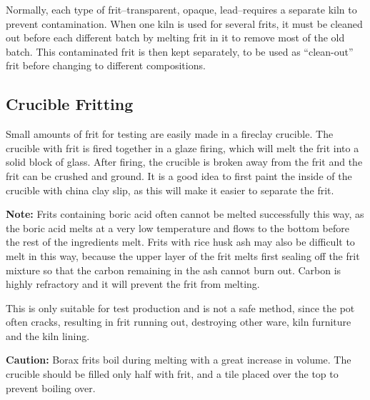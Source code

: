 Normally, each type of frit--transparent, opaque, lead--requires a separate 
kiln to prevent contamination. When one kiln is used for several frits, it must 
be cleaned out before each different batch by melting frit in it to remove most 
of the old batch. This contaminated frit is then kept separately, to be used as 
``clean-out'' frit before changing to different compositions.
\subsection{Crucible Fritting}
Small amounts of frit for testing are easily made in a fireclay crucible. The 
crucible with frit is fired together in a glaze firing, which will melt the 
frit into a solid block of glass. After firing, the crucible is broken away 
from the frit and the frit can be crushed and ground. It is a good idea to 
first paint the inside of the crucible with china clay slip, as this will make 
it easier to separate the frit. 

\textbf{Note:} Frits containing boric acid often cannot be melted successfully 
this way, as the boric acid melts at a very low temperature and flows to the 
bottom before the rest of the ingredients melt. Frits with rice husk ash may 
also be difficult to melt in this way, because the upper layer of the frit 
melts first sealing off the frit mixture so that the carbon remaining in the 
ash cannot burn out. Carbon is highly refractory and it will prevent the frit 
from melting.

This is only suitable for test production and is not a safe method, since the 
pot often cracks, resulting in frit running out, destroying other ware, kiln 
furniture and the kiln lining.

\textbf{Caution:} Borax frits boil during melting with a great increase in 
volume. The crucible should be filled only half with frit, and a tile placed 
over the top to prevent boiling over.

